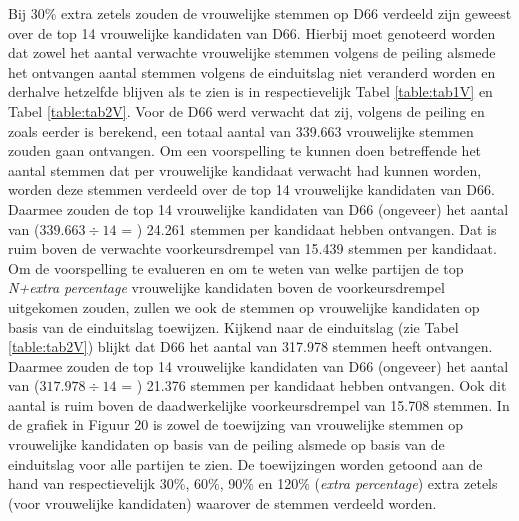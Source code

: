 Bij 30\% extra zetels zouden de vrouwelijke stemmen op D66 verdeeld zijn geweest over de top 14 vrouwelijke kandidaten van D66. Hierbij moet genoteerd worden dat zowel het aantal verwachte vrouwelijke stemmen volgens de peiling alsmede het ontvangen aantal stemmen volgens de einduitslag niet veranderd worden en derhalve hetzelfde blijven als te zien is in respectievelijk Tabel \ref{table:tab1V} en Tabel \ref{table:tab2V}. Voor de D66 werd verwacht dat zij, volgens de peiling en zoals eerder is berekend, een totaal aantal van 339.663 vrouwelijke stemmen zouden gaan ontvangen. Om een voorspelling te kunnen doen betreffende het aantal stemmen dat per vrouwelijke kandidaat verwacht had kunnen worden, worden deze stemmen verdeeld over de top 14 vrouwelijke kandidaten van D66. Daarmee zouden de top 14 vrouwelijke kandidaten van D66 (ongeveer) het aantal van ($339.663\div14$ = ) 24.261 stemmen per kandidaat hebben ontvangen. Dat is ruim boven de verwachte voorkeursdrempel van 15.439 stemmen per kandidaat. Om de voorspelling te evalueren en om te weten van welke partijen de top \textit{N+extra percentage} vrouwelijke kandidaten boven de voorkeursdrempel uitgekomen zouden, zullen we ook de stemmen op vrouwelijke kandidaten op basis van de einduitslag toewijzen. Kijkend naar de einduitslag (zie Tabel \ref{table:tab2V}) blijkt dat D66 het aantal van 317.978 stemmen heeft ontvangen. Daarmee zouden de top 14 vrouwelijke kandidaten van D66 (ongeveer) het aantal van ($317.978\div14$ = ) 21.376 stemmen per kandidaat hebben ontvangen. Ook dit aantal is ruim boven de daadwerkelijke voorkeursdrempel van 15.708 stemmen. In de grafiek in Figuur 20 is zowel de toewijzing van vrouwelijke stemmen op vrouwelijke kandidaten op basis van de peiling alsmede op basis van de einduitslag voor alle partijen te zien. De toewijzingen worden getoond aan de hand van respectievelijk 30\%, 60\%, 90\% en 120\% (\textit{extra percentage}) extra zetels (voor vrouwelijke kandidaten) waarover de stemmen verdeeld worden.

